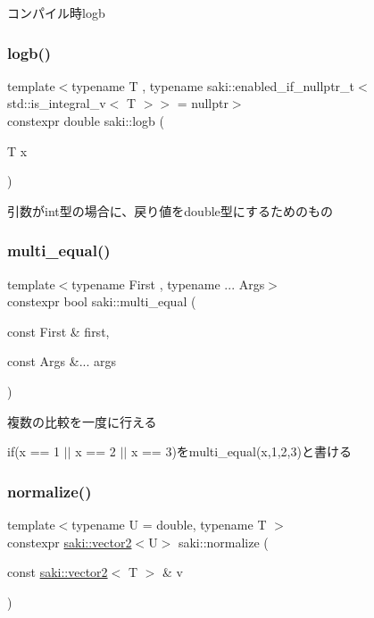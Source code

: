 コンパイル時logb 

\mbox{\label{namespacesaki_adf4ba562bb9897e98b75eb95027bfad5}} 
\subsubsection{\texorpdfstring{logb()}{logb()}\hspace{0.1cm}{\footnotesize\ttfamily [2/2]}}
{\footnotesize\ttfamily template$<$typename T , typename saki\+::enabled\+\_\+if\+\_\+nullptr\+\_\+t$<$ std\+::is\+\_\+integral\+\_\+v$<$ T $>$$>$  = nullptr$>$ \\
constexpr double saki\+::logb (\begin{DoxyParamCaption}\item[{T}]{x }\end{DoxyParamCaption})}



引数がint型の場合に、戻り値をdouble型にするためのもの 

\mbox{\label{namespacesaki_a08e1e3f9c27a1f59e6f096bcd22c8749}} 
\subsubsection{\texorpdfstring{multi\+\_\+equal()}{multi\_equal()}}
{\footnotesize\ttfamily template$<$typename First , typename ... Args$>$ \\
constexpr bool saki\+::multi\+\_\+equal (\begin{DoxyParamCaption}\item[{const First \&}]{first,  }\item[{const Args \&...}]{args }\end{DoxyParamCaption})}



複数の比較を一度に行える 

if(x == 1 $\vert$$\vert$ x == 2 $\vert$$\vert$ x == 3)をmulti\+\_\+equal(x,1,2,3)と書ける \mbox{\label{namespacesaki_a0ca208fb45c585d9cd23276fb91e40ee}} 
\subsubsection{\texorpdfstring{normalize()}{normalize()}\hspace{0.1cm}{\footnotesize\ttfamily [1/3]}}
{\footnotesize\ttfamily template$<$typename U  = double, typename T $>$ \\
constexpr \mbox{\hyperlink{classsaki_1_1vector2}{saki\+::vector2}}$<$U$>$ saki\+::normalize (\begin{DoxyParamCaption}\item[{const \mbox{\hyperlink{classsaki_1_1vector2}{saki\+::vector2}}$<$ T $>$ \&}]{v }\end{DoxyParamCaption})}



